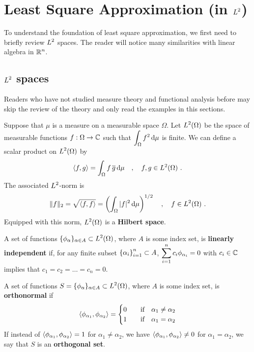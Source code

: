 \chapter{Least Square Approximation (in $\displaystyle L^2$)}\label{chaptApproxA}

To understand the foundation of least square approximation, we first 
need to briefly review $\displaystyle L^2$ spaces.  The reader will notice many
similarities with linear algebra in $\displaystyle \mathbb{R}^n$.

\section{$\displaystyle L^2$ spaces}

Readers who have not studied measure theory and functional analysis
before may skip the review of the theory and only read the examples in
this sections.

Suppose that $\mu$ is a measure on a measurable space $\Omega$.  Let
$\displaystyle L^2(\Omega)$ be the space of measurable functions
$f:\Omega \rightarrow \mathbb{C}$ such that
$\displaystyle \int_\Omega f^2 \,\mathrm{d}\mu$ is finite.  We can define
a scalar product on $\displaystyle L^2(\Omega)$ by
\[
\left\langle{f} , {g}\right\rangle = \int_\Omega f\, \overline{g} \,\mathrm{d}\mu \quad , \quad
f, g \in L^2(\Omega) \ .
\]
The associated $\displaystyle L^2$-norm is
\[
\| f \|_2 = \sqrt{\left\langle{f} , {f}\right\rangle} = \left(\int_\Omega |f|^2 \,\mathrm{d}\mu\right)^{1/2}
\quad , \quad  f \in L^2(\Omega) \ .
\]
Equipped with this norm, $\displaystyle L^2(\Omega)$ is a
{\bfseries Hilbert space}.

\begin{defn}
A set of functions
$\displaystyle \{ \phi_\alpha \}_{\alpha \in A} \subset L^2(\Omega)$, where
$A$ is some index set, is
{\bfseries linearly independent}
if, for any finite subset
$\displaystyle \left\{ \alpha_i \right\}_{i=1}^n \subset A$,
$\displaystyle \sum_{i=1}^n c_i \phi_{\alpha_i} = 0$ with $c_i \in \mathbb{C}$
implies that $c_1=c_2 = \ldots = c_n = 0$.
\end{defn}

\begin{defn}
A set of functions
$\displaystyle S=\{ \phi_\alpha \}_{\alpha \in A} \subset L^2(\Omega)$, where
$A$ is some index set, is
{\bfseries orthonormal} if
\[
\left\langle{\phi_{\alpha_1}} , {\phi_{\alpha_2}}\right\rangle =
\begin{cases}
0 & \quad \text{if} \quad \alpha_1 \neq \alpha_2 \\
1 & \quad \text{if} \quad \alpha_1 = \alpha_2
\end{cases}
\]
If instead of $\displaystyle \left\langle{\phi_{\alpha_1}} , {\phi_{\alpha_2}}\right\rangle = 1$ for
$\alpha_1 \neq \alpha_2$, we have
$\displaystyle \left\langle{\phi_{\alpha_1}} , {\phi_{\alpha_2}}\right\rangle \neq 0$ for
$\alpha_1 = \alpha_2$, we say that $S$ is an
{\bfseries orthogonal set}.
\end{defn}

